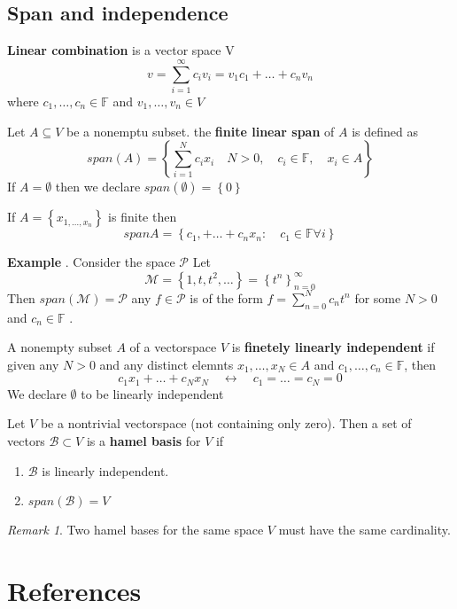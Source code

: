 \documentclass{article}
\theoremstyle{remark}
\newtheorem*{remark}{Remark}
\begin{document}
\subsection{Span and independence}%
\label{sub:span_and_independence}

  \textbf{Linear combination } is a vector space V \[
  v = \sum_{i=1}^{\infty}  c_{i} v_{i} = v_{1} c_{1} + \ldots +  c_{n} v_{n}
  \]  
  where $c_{1}, \ldots , c_{n} \in  \mathbb{F} $ and $v_{1}, \ldots, v_{n} \in  V$ 
\begin{definition}
  Let $A \subseteq  V$ be a nonemptu subset. the \textbf{finite linear span}  of $A$ is defined as \[
  span\left( A \right)  = \left\{ \sum_{i=1}^{N} c_{i} x_{i} \quad  N>0 , \quad  c_{i } \in  \mathbb{F}  , \quad x_{i } \in  A    \right\}
  \] 
  If $A = \emptyset $ then we declare $span\left( \emptyset  \right) = \left\{ 0 \right\}$  
  
  \newpara
  If $ A = \left\{ x_{1, \ldots, x_{n}}  \right\} $ is finite then \[
  span A = \left\{ c_{1}, + \ldots + c_{n} x_{n} : \quad  c_{1} \in  \mathbb{F}  \forall i  \right\}
  \] 
\end{definition}

\textbf{Example} . Consider the space $\mathcal{P} $ Let \[
\mathcal{M}  = \left\{ 1, t, t^{2} , \ldots  \right\} = \left\{ t^{n} \right\}_{n=0}^{\infty}
\] 
Then $span\left( \mathcal{M}  \right) = \mathcal{P} $ any $f \in  \mathcal{P}  $ is of the form $f = \sum_{n=0}^{N} c_{n} t^{n}$ for some $N>0$ and $c_{n} \in  \mathbb{F} $ .
\begin{definition}
  A nonempty subset $A$ of a vectorspace $V$ is \textbf{finetely linearly independent}  if  given any $N >0$ and any distinct elemnts $x_{1},  \ldots, x_{N} \in A$ and $c_{1} , \ldots, c_{n} \in  \mathbb{F} $, then \[
  c_{1} x_{1} + \ldots + c_{N} x_{N} \quad \leftrightarrow \quad c_{1} = \ldots = c_{N} = 0  
  \] 
  We declare $\emptyset $ to be linearly independent
\end{definition}

\begin{definition}
  Let $V$ be a nontrivial vectorspace (not containing only zero). Then a set of vectors $\mathcal{B}  \subset V$ is a \textbf{hamel basis} for $V$ if
  \begin{enumerate}
    \item $\mathcal{B} $ is linearly independent.
    \item $span\left( \mathcal{B}  \right) = V$
  \end{enumerate}
\end{definition}
 \begin{remark}
   Two hamel bases for the same space $V$ must have the same cardinality.
 \end{remark}


\newpage
\section{References}%
\label{sec:references}




\end{document}
